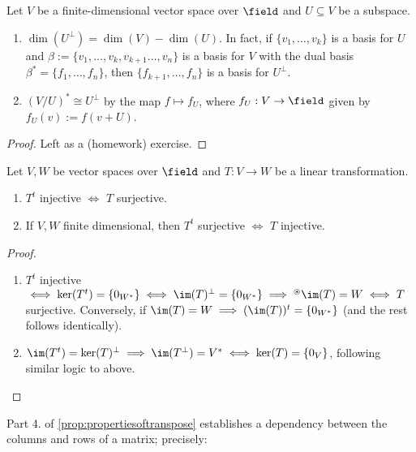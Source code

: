 \begin{theorem}
    Let $V$ be a finite-dimensional vector space over $\field$ and $U \subseteq V$ be a subspace. \begin{enumerate}
        \item $\dim(U^\perp) = \dim(V) - \dim(U)$. In fact, if $\{v_1, \dots, v_k\}$ is a basis for $U$ and $\beta := \{v_1, \dots, v_k, v_{k+1} \dots, v_n\}$ is a basis for $V$ with the dual basis $\beta^\ast = \{f_1, \dots, f_n\}$, then $\{f_{k+1}, \dots, f_n\}$ is a basis for $U^\perp$.
        \item $(V/U)^\ast \cong U^\perp$ by the map $f \mapsto f_U$, where $f_U:V \to \field$ given by $f_U(v) := f(v + U)$.
    \end{enumerate}
\end{theorem}
\begin{proof}
    Left as a (homework) exercise.
\end{proof}

\begin{corollary}
    Let $V, W$ be vector spaces over $\field$ and $T: V \to W$ be a linear transformation.
    \begin{enumerate}
        \item $T^t$ injective $\iff$ $T$ surjective.
        \item If $V, W$ finite dimensional, then $T^t$ surjective $\iff$ $T$ injective.
    \end{enumerate}
\end{corollary}

\begin{proof}
    \begin{enumerate}
        \item $T^t$ injective $\iff \ker(T^t) = \{0_{W^\ast}\} \iff \im(T)^\perp = \{0_{W^\ast}\}\implies^{\circledast}\im(T) = W \iff T$ surjective. Conversely, if $\im(T) = W \implies (\im(T))^t = \{0_{W^\ast}\}$ (and the rest follows identically).
        \item $\im(T^t) = \ker(T)^\perp \implies \im(T^\perp) = V^\ast \iff \ker(T) = \{0_V\}$, following similar logic to above.
    \end{enumerate}
\end{proof}

\begin{remark}
    Part 4. of \cref{prop:propertiesoftranspose} establishes a dependency between the columns and rows of a matrix; precisely:
\end{remark}
